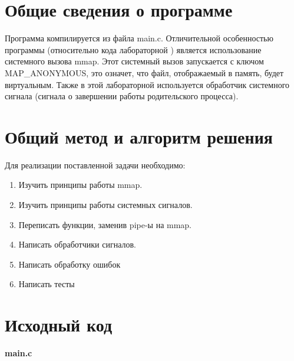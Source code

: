 \section{Общие сведения о программе}

Программа компилируется из файла main.c. Отличительной особенностью программы (относительно кода лабораторной ) является использование системного вызова mmap. Этот системный вызов запускается с ключом MAP\_ANONYMOUS, это означет, что файл, отображаемый в память, будет виртуальным. Также в этой лабораторной используется обработчик системного сигнала (сигнала о завершении работы родительского процесса).

\section{Общий метод и алгоритм решения}

Для реализации поставленной задачи необходимо:

\begin{enumerate}
    \item Изучить принципы работы mmap.
    \item Изучить принципы работы системных сигналов.
    \item Переписать функции, заменив pipe-ы на mmap.
    \item Написать обработчики сигналов.
    \item Написать обработку ошибок
    \item Написать тесты
\end{enumerate}

\pagebreak

\section{Исходный код}

\textbf{main.c}

